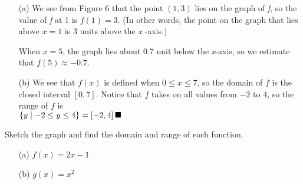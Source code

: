 \documentclass{sebase}
\begin{document}
\begin{Solution}
\thinspace

\begin{enumerate}
\item[(a)] We see from Figure 6 that the point $(1,3)$ lies on the graph of 
\textit{f}, so the value of \textit{f} at 1 is $f(1)=3$. (In other words,
the point on the graph that lies above $x=1$ is $3$ units above the \textit{x%
}-axis.)

\quad When $x=5$, the graph lies about 0.7 unit below the \textit{x}-axis,
so we estimate that $f(5)\approx -0.7$.

\item[(b)] 
We
see that $f\left( x\right) $ is defined when $0\leq x\leq 7$, so the domain
of $f$ is the closed interval $\left[ 0,7\right] $. Notice that $f$ takes on
all values from $-2$ to $4$, so the range of $f$ is%
\enlargethispage{12pt}%
\\[4pt]
$\hspace*{\stretch{2}}\left\{ y\mid -2\leq y\leq 4\right\} =\left[ -2,4%
\right] \hfill \blacksquare $\pagebreak
\end{enumerate}
\end{Solution}

\begin{Example}[2]
Sketch the graph and find the domain and range of each function.

\begin{enumerate}
\item[(a)] 
%
$f(x)=2x-1$

\item[(b)] 
%
$g(x)=x^{2}$
\end{enumerate}
\end{Example}
\end{document}
